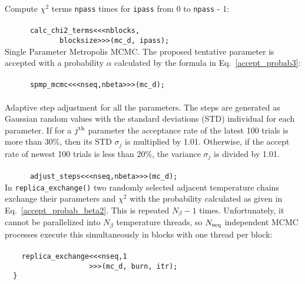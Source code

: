 \documentclass[preprint2]{aastex}
\begin{document}
Compute $\chi^2$ terms \verb|npass| times for \verb|ipass| from 0 to \verb|npass| - 1: \\ \\
\verb|      calc_chi2_terms<<<nblocks,| \\
\verb|             blocksize>>>(mc_d, ipass);| \\

Single Parameter Metropolis MCMC. The proposed tentative parameter is accepted with a probability $\alpha$ calculated by the formula in Eq.~\eqref{accept_probab3}: \\ \\
\verb|      spmp_mcmc<<<nseq,nbeta>>>(mc_d);| \\ \\

Adaptive step adjustment for all the parameters. The steps are generated as Gaussian random values with the standard deviations (STD) individual for each parameter. If for a $j^{\rm th}$ parameter the acceptance rate of the latest 100 trials is more than 30\%, then its STD $\sigma_j$ is multiplied by 1.01. Otherwise, if the accept rate of newest 100 trials is less than 20\%, the variance $\sigma_j$ is divided by 1.01. \\ \\
\verb|      adjust_steps<<<nseq,nbeta>>>(mc_d);|  \\

In \verb|replica_exchange()| two randomly selected adjacent temperature chains exchange their parameters and $\chi^2$ with the probability calculated as given in Eq.~\eqref{accept_probab_beta2}. This is repeated
$N_\beta-1$ times. Unfortunately, it cannot be parallelized into $N_\beta$ temperature threads, so $N_{\rm seq}$ independent MCMC processes execute this simultaneously in blocks with one thread per block: \\ \\ 
\verb|    replica_exchange<<<nseq,1| \\
\verb|                    >>>(mc_d, burn, itr);| \\
\verb|  }| \\ \\
\end{document}
